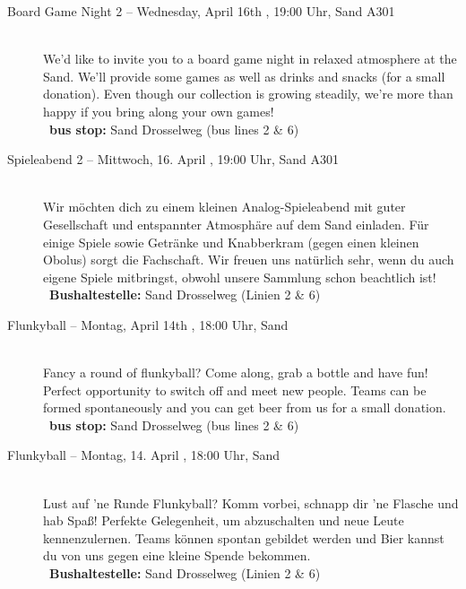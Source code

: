 \begin{description}
\ifml
    \item[Board Game Night 2 -- Wednesday, April 16th \YEAR, 19:00 Uhr, Sand A301]~\\%
    We'd like to invite you to a board game night in relaxed atmosphere at the Sand.
    We'll provide some games as well as drinks and snacks (for a small donation).
    Even though our collection is growing steadily, we're more than happy if you bring along your own games!\\
    ~\textbf{bus stop:} Sand Drosselweg (bus lines 2 \& 6)
\else
    \item[Spieleabend 2 -- Mittwoch, 16. April \YEAR, 19:00 Uhr, Sand A301]~\\%
    Wir möchten dich zu einem kleinen Analog-Spieleabend mit guter Gesellschaft und entspannter Atmosphäre auf dem Sand einladen.
    Für einige Spiele sowie Getränke und Knabberkram (gegen einen kleinen Obolus) sorgt die Fachschaft.
    Wir freuen uns natürlich sehr, wenn du auch eigene Spiele mitbringst, obwohl unsere Sammlung schon beachtlich ist!\\
    ~\textbf{Bushaltestelle:} Sand Drosselweg (Linien 2 \& 6)
\fi

\ifml
    \item[Flunkyball -- Montag, April 14th \YEAR, 18:00 Uhr, Sand]~\\
    Fancy a round of flunkyball? Come along, grab a bottle and have fun!
    Perfect opportunity to switch off and meet new people.
    Teams can be formed spontaneously and you can get beer from us for a small donation.\\
    ~\textbf{bus stop:} Sand Drosselweg (bus lines 2 \& 6)
\else
    \item[Flunkyball -- Montag, 14. April \YEAR, 18:00 Uhr, Sand]~\\
    Lust auf 'ne Runde Flunkyball? Komm vorbei, schnapp dir 'ne Flasche und hab Spaß!
    Perfekte Gelegenheit, um abzuschalten und neue Leute kennenzulernen.
    Teams können spontan gebildet werden und Bier kannst du von uns gegen eine kleine Spende bekommen.\\
    ~\textbf{Bushaltestelle:} Sand Drosselweg (Linien 2 \& 6)
\fi

\ifmedinfo \ifmaster \pagebreak \fi \fi
\ifinfo \ifmaster \iflehramt \else \pagebreak \fi \fi \fi
\ifmedien \ifmaster \pagebreak \fi \fi


\end{description}
